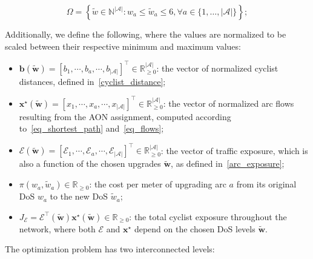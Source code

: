 \documentclass[letterpaper, 10 pt, conference]{ieeeconf}  %
\begin{document}
\begin{equation}
\Omega = \left \{ \tilde{w} \in \mathbb{N}^{|\mathcal{A}|} \colon w_{a} \leq \tilde{w}_{a} \leq 6,  \forall a \in \{1, \ldots, |\mathcal{A}| \} \right\};    
\end{equation}

Additionally, we define the following, where the values are normalized to be scaled between their respective minimum and maximum values:

\begin{itemize}
    \item $\mathbf{b}(\tilde{\mathbf{w}}) = \left [ b_{1}, \cdots, b_{a}, \cdots, b_{|\mathcal{A}|} \right ]^\top \in \mathbb{R}^{|\mathcal{A}|}_{\geq 0}$: the vector of normalized  cyclist distances, defined in~\eqref{cyclist_distance};
    \item $\mathbf{x}^\star(\tilde{\mathbf{w}}) = \left [ x_{1}, \cdots, x_{a}, \cdots, x_{|\mathcal{A}|} \right ]^\top \in \mathbb{R}^{|\mathcal{A}|}_{\geq 0}$: the vector of normalized arc flows resulting from the AON assignment, computed according to~\eqref{eq_shortest_path} and~\eqref{eq_flows};
    \item $\boldsymbol{\mathcal{E}}(\tilde{\mathbf{w}}) = \left [ \mathcal{E}_{1}, \cdots, \mathcal{E}_{a}, \cdots, \mathcal{E}_{|\mathcal{A}|} \right ]^\top \in \mathbb{R}^{|\mathcal{A}|}_{\geq 0}$: the vector of traffic exposure, which is also a function of the chosen upgrades $\tilde{\mathbf{w}}$, as defined in~\eqref{arc_exposure};
    \item $\pi(w_{a},\tilde{w}_{a}) \in \mathbb{R}_{\geq 0}$: the cost per meter of upgrading arc $a$ from its original DoS $w_{a}$ to the new DoS $\tilde{w}_{a}$;
    \item $J_{\mathcal{E}} = \boldsymbol{\mathcal{E}}^\top(\tilde{\mathbf{w}}) \mathbf{x}^\star(\tilde{\mathbf{w}}) \in \mathbb{R}_{\geq 0}$: the total cyclist exposure throughout the network, where both $\boldsymbol{\mathcal{E}}$ and $\mathbf{x}^{\star}$ depend on the chosen DoS levels $\tilde{\mathbf{w}}$.
\end{itemize}

The optimization problem has two interconnected levels:
\end{document}
